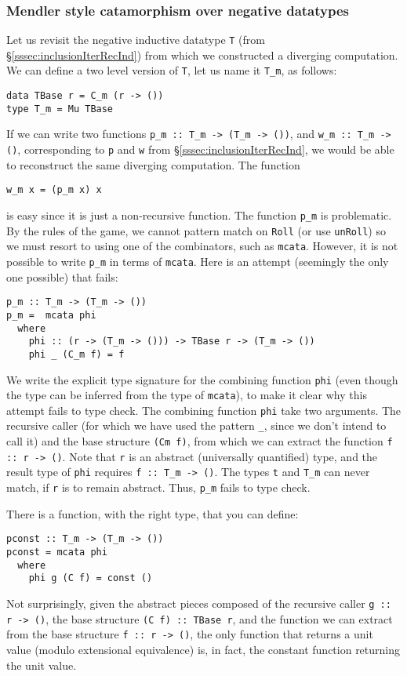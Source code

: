 \subsubsection{Mendler style catamorphism over negative datatypes}
\label{sssec:mcataNegative}
Let us revisit the negative inductive datatype \verb|T|
(from \S\ref{sssec:inclusionIterRecInd})
from which we constructed a diverging computation.
We can define a two level version of \verb|T|, let us name it \verb|T_m|,
as follows:
\begin{verbatim}
data TBase r = C_m (r -> ())
type T_m = Mu TBase
\end{verbatim}
If we can write two functions \verb|p_m :: T_m -> (T_m -> ())|,
and \verb|w_m :: T_m -> ()|, corresponding to \verb|p| and \verb|w|
from \S\ref{sssec:inclusionIterRecInd}, we would be able to reconstruct
the same diverging computation.
The function
\begin{verbatim}
w_m x = (p_m x) x
\end{verbatim}
is easy since it is just a non-recursive function. The function
\verb|p_m| is problematic. By the rules of the game,
we cannot pattern match on \verb|Roll|
(or use \verb|unRoll|) so we must resort to using one of the
combinators, such as \verb|mcata|.
However, it is not possible to write \verb|p_m|
in terms of \verb|mcata|.
Here is an attempt (seemingly the only one possible) that fails:
\begin{verbatim}
p_m :: T_m -> (T_m -> ())
p_m =  mcata phi
  where
    phi :: (r -> (T_m -> ())) -> TBase r -> (T_m -> ())
    phi _ (C_m f) = f
\end{verbatim}
We write the explicit type signature for the combining function \verb|phi|
(even though the type can be inferred from the type of \verb|mcata|),
to make it clear why this attempt fails to type check. The combining
function \verb|phi| take two arguments. The recursive caller (for which we
have used the pattern \verb|_|, since we don't intend to call it) and the
base structure \verb|(Cm f)|, from which we can extract
the function \verb|f :: r -> ()|. Note that \verb|r| is an abstract
(universally quantified) type, and the result type of \verb|phi| requires
\verb|f :: T_m -> ()|. The types \verb|t| and \verb|T_m| can never match, if \verb|r|
is to remain abstract. Thus, \verb|p_m| fails to type check.

There is a function, with the right type, that you can define:
\begin{verbatim}
pconst :: T_m -> (T_m -> ())
pconst = mcata phi
  where
    phi g (C f) = const ()
\end{verbatim}
Not surprisingly, given the abstract pieces composed of
the recursive caller \verb|g :: r -> ()|, the base structure \verb|(C f) :: TBase r|,
and the function we can extract from the base structure \verb|f :: r -> ()|,
the only function that returns a unit value (modulo extensional
equivalence) is, in fact, the constant function returning the unit value.

